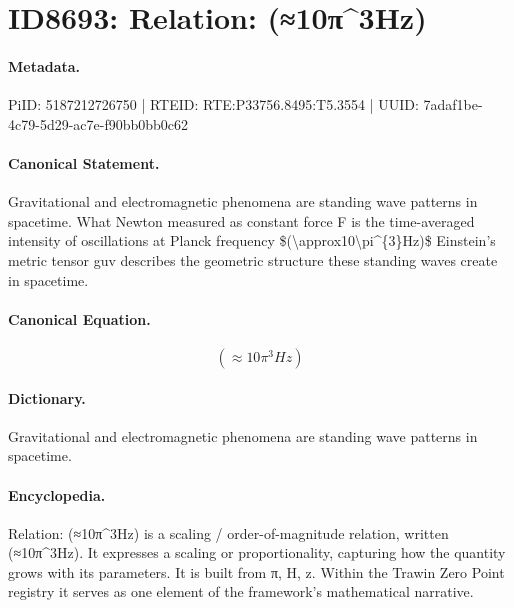 \section*{ID8693: Relation: (≈10π\textasciicircum{}3Hz)}
\paragraph{Metadata.}
PiID: 5187212726750 | RTEID: RTE:P33756.8495:T5.3554 | UUID: 7adaf1be-4c79-5d29-ac7e-f90bb0bb0c62

\paragraph{Canonical Statement.}
Gravitational and electromagnetic phenomena are standing wave patterns in spacetime. What Newton measured as constant force F is the time-averaged intensity of oscillations at Planck frequency \$(\textbackslash{}approx10\textbackslash{}pi\textasciicircum{}\{3\}Hz)\$ Einstein's metric tensor guv describes the geometric structure these standing waves create in spacetime.

\paragraph{Canonical Equation.}
\[
(\approx10\pi^{3}Hz)
\]

\paragraph{Dictionary.}
Gravitational and electromagnetic phenomena are standing wave patterns in spacetime.

\paragraph{Encyclopedia.}
Relation: (≈10π\textasciicircum{}3Hz) is a scaling / order-of-magnitude relation, written (≈10π\textasciicircum{}3Hz). It expresses a scaling or proportionality, capturing how the quantity grows with its parameters. It is built from π, H, z. Within the Trawin Zero Point registry it serves as one element of the framework's mathematical narrative.
